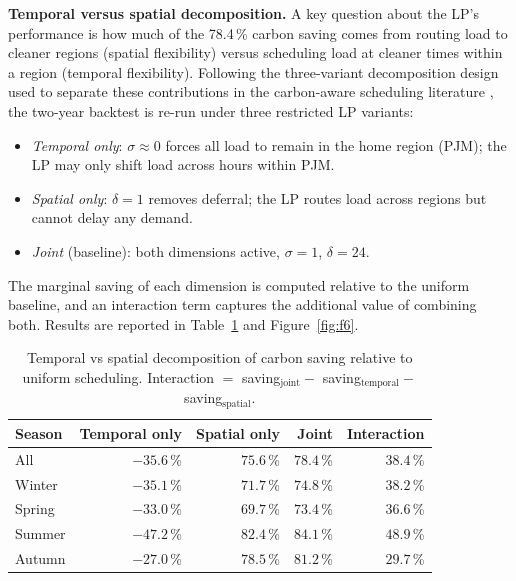 \documentclass[11pt, a4paper]{article}
\begin{document}
\textbf{Temporal versus spatial decomposition.} A key question about the LP's performance is how much of the 78.4\,\% carbon saving comes from routing load to cleaner regions (spatial flexibility) versus scheduling load at cleaner times within a region (temporal flexibility). Following the three-variant decomposition design used to separate these contributions in the carbon-aware scheduling literature \citep{sukprasert2024limitations}, the two-year backtest is re-run under three restricted LP variants:

\begin{itemize}
  \item \emph{Temporal only}: $\sigma \approx 0$ forces all load to remain in the home region (PJM); the LP may only shift load across hours within PJM.
  \item \emph{Spatial only}: $\delta = 1$ removes deferral; the LP routes load across regions but cannot delay any demand.
  \item \emph{Joint} (baseline): both dimensions active, $\sigma = 1$, $\delta = 24$.
\end{itemize}

The marginal saving of each dimension is computed relative to the uniform baseline, and an interaction term captures the additional value of combining both. Results are reported in Table~\ref{tab:decomp} and Figure~\ref{fig:f6}.

\begin{table}[h]
\centering\small
\renewcommand{\arraystretch}{1.3}
\begin{tabularx}{\linewidth}{lrrrr}
\toprule
\textbf{Season} & \textbf{Temporal only} & \textbf{Spatial only} & \textbf{Joint} & \textbf{Interaction} \\
\midrule
All    & $-35.6$\,\% & $75.6$\,\% & $78.4$\,\% & $38.4$\,\% \\
Winter & $-35.1$\,\% & $71.7$\,\% & $74.8$\,\% & $38.2$\,\% \\
Spring & $-33.0$\,\% & $69.7$\,\% & $73.4$\,\% & $36.6$\,\% \\
Summer & $-47.2$\,\% & $82.4$\,\% & $84.1$\,\% & $48.9$\,\% \\
Autumn & $-27.0$\,\% & $78.5$\,\% & $81.2$\,\% & $29.7$\,\% \\
\bottomrule
\end{tabularx}
\caption{Temporal vs spatial decomposition of carbon saving relative to uniform scheduling. Interaction $=$ saving$_\text{joint} -$ saving$_\text{temporal} -$ saving$_\text{spatial}$. \label{tab:decomp}}
\end{table}
\end{document}
